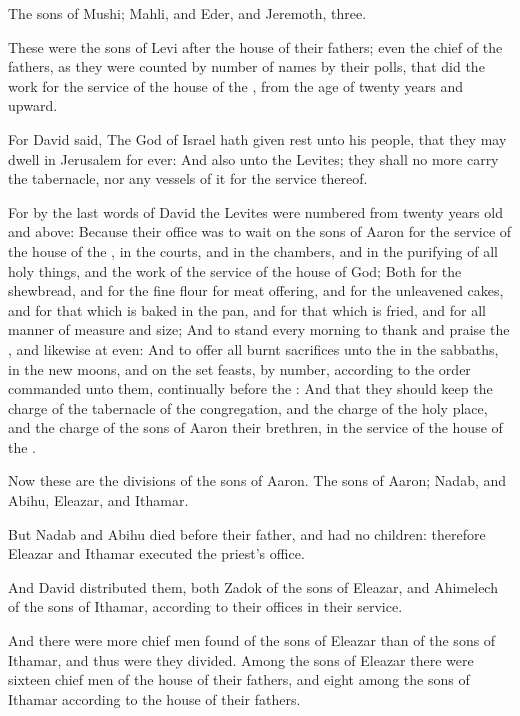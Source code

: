 \Verse The sons of Mushi; Mahli, and Eder, and Jeremoth, three.

\Verse These were the sons of Levi after the house of their fathers; even the chief of the fathers, as they were counted by number of names by their polls, that did the work for the service of the house of the \LORD, from the age of twenty years and upward.

\Verse For David said, The \LORD God of Israel hath given rest unto his people, that they may dwell in Jerusalem for ever: \Verse And also unto the Levites; they shall no more carry the tabernacle, nor any vessels of it for the service thereof.

\Verse For by the last words of David the Levites were numbered from twenty years old and above: \Verse Because their office was to wait on the sons of Aaron for the service of the house of the \LORD, in the courts, and in the chambers, and in the purifying of all holy things, and the work of the service of the house of God; \Verse Both for the shewbread, and for the fine flour for meat offering, and for the unleavened cakes, and for that which is baked in the pan, and for that which is fried, and for all manner of measure and size; \Verse And to stand every morning to thank and praise the \LORD, and likewise at even: \Verse And to offer all burnt sacrifices unto the \LORD in the sabbaths, in the new moons, and on the set feasts, by number, according to the order commanded unto them, continually before the \LORD: \Verse And that they should keep the charge of the tabernacle of the congregation, and the charge of the holy place, and the charge of the sons of Aaron their brethren, in the service of the house of the \LORD.


\Chapter
\Verse Now these are the divisions of the sons of Aaron. The sons of Aaron; Nadab, and Abihu, Eleazar, and Ithamar.

\Verse But Nadab and Abihu died before their father, and had no children: therefore Eleazar and Ithamar executed the priest's office.

\Verse And David distributed them, both Zadok of the sons of Eleazar, and Ahimelech of the sons of Ithamar, according to their offices in their service.

\Verse And there were more chief men found of the sons of Eleazar than of the sons of Ithamar, and thus were they divided. Among the sons of Eleazar there were sixteen chief men of the house of their fathers, and eight among the sons of Ithamar according to the house of their fathers.

